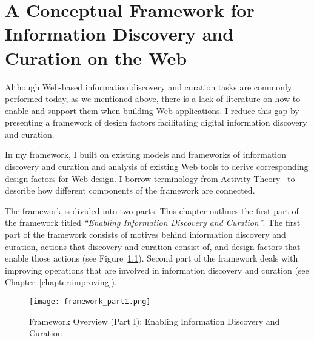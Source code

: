 \chapter{A Conceptual Framework for Information Discovery and Curation on the Web}
\label{chapter:framework}

Although Web-based information discovery and curation tasks are commonly performed today, as we mentioned above, there is a lack of literature on how to enable and support them when building Web applications. I reduce this gap by presenting a framework of design factors facilitating digital information discovery and curation. 

In my framework, I built on existing models and frameworks of information discovery and curation and analysis of existing Web tools to derive corresponding design factors for Web design. I borrow terminology from Activity Theory~\cite{kuutti1996activity} to describe how different components of the framework are connected. 

The framework is divided into two parts. This chapter outlines the first part of the framework titled \textit{``Enabling Information Discovery and Curation''}. The first part of the framework consists of motives behind information discovery and curation, actions that discovery and curation consist of, and design factors that enable those actions (see Figure~\ref{fig:framework_part1}). Second part of the framework deals with improving operations that are involved in information discovery and curation (see Chapter~\ref{chapter:improving}).

\begin{figure}[ht!]
	\noindent
	\centering
	\texttt{[image: framework\_part1.png]}
	\caption{Framework Overview (Part I): Enabling Information Discovery and Curation}
	\label{fig:framework_part1} 
\end{figure}

